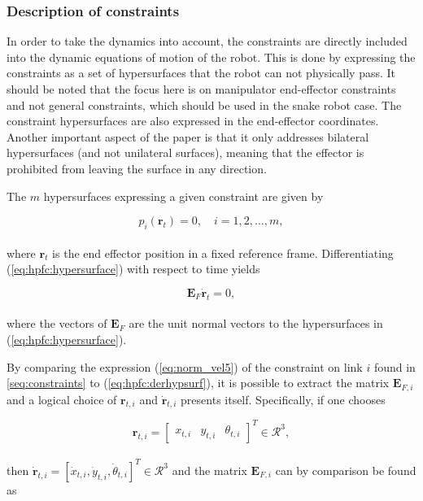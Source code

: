 \subsubsection{Description of constraints}

In order to take the dynamics into account, the constraints are directly included into the dynamic equations of motion of the robot. This is done by expressing the constraints as a set of hypersurfaces that the robot can not physically pass. It should be noted that the focus here is on manipulator end-effector constraints and not general constraints, which should be used in the snake robot case. The constraint hypersurfaces are also expressed in the end-effector coordinates. Another important aspect of the paper is that it only addresses bilateral hypersurfaces (and not unilateral surfaces), meaning that the effector is prohibited from leaving the surface in any direction.

The $m$ hypersurfaces expressing a given constraint are given by

\begin{equation}\label{eq:hpfc:hypersurface}
    p_i(\mathbf{r}_t) = 0, \quad i = 1, 2, ..., m,
\end{equation}
\\
where $\mathbf{r}_t$ is the end effector position in a fixed reference frame. Differentiating (\ref{eq:hpfc:hypersurface}) with respect to time yields

\begin{equation}\label{eq:hpfc:derhypsurf}
    \mathbf{E}_F \mathbf{\dot{r}}_t = 0,
\end{equation}
\\
where the vectors of $\mathbf{E}_F$ are the unit normal vectors to the hypersurfaces in (\ref{eq:hpfc:hypersurface}).

By comparing the expression (\ref{eq:norm_vel5}) of the constraint on link $i$ found in \ref{seq:constraints} to (\ref{eq:hpfc:derhypsurf}), it is possible to extract the matrix $\mathbf{E}_{F,i}$ and a logical choice of $\mathbf{r}_{t,i}$ and $\mathbf{\dot{r}}_{t,i}$ presents itself.
Specifically, if one chooses

\begin{equation}
    \mathbf{r}_{t,i} =
    \begin{bmatrix}
        x_{t,i} & y_{t,i} & \theta_{t,i}
    \end{bmatrix}^T \in \mathcal{R}^3,
\end{equation}
\\
then $\mathbf{\dot{r}}_{t,i} = [\dot{x}_{t,i}, \dot{y}_{t,i}, \dot{\theta}_{t,i}]^T \in \mathcal{R}^3$ and the matrix $\mathbf{E}_{F,i}$ can by comparison be found as

